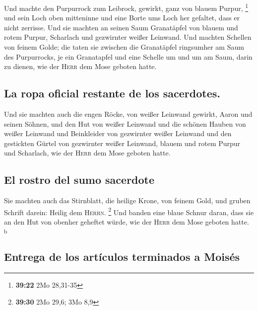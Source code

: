  Und machte den Purpurrock zum Leibrock, gewirkt, ganz
von blauem Purpur, \footnote{\textbf{39:22} 2Mo 28,31-35}
 und sein Loch oben mitteninne und eine Borte ums Loch
her gefaltet, dass er nicht zerrisse.  Und sie machten an
seinen Saum Granatäpfel von blauem und rotem Purpur, Scharlach und
gezwirnter weißer Leinwand.  Und machten Schellen von
feinem Golde; die taten sie zwischen die Granatäpfel ringsumher am Saum
des Purpurrocks,  je ein Granatapfel und eine Schelle um
und um am Saum, darin zu dienen, wie der \textsc{Herr} dem Mose geboten
hatte.

\hypertarget{la-ropa-oficial-restante-de-los-sacerdotes.}{%
\subsection{La ropa oficial restante de los
sacerdotes.}\label{la-ropa-oficial-restante-de-los-sacerdotes.}}

 Und sie machten auch die engen Röcke, von weißer
Leinwand gewirkt, Aaron und seinen Söhnen,  und den Hut
von weißer Leinwand und die schönen Hauben von weißer Leinwand und
Beinkleider von gezwirnter weißer Leinwand  und den
gestickten Gürtel von gezwirnter weißer Leinwand, blauem und rotem
Purpur und Scharlach, wie der \textsc{Herr} dem Mose geboten hatte.

\hypertarget{el-rostro-del-sumo-sacerdote}{%
\subsection{El rostro del sumo
sacerdote}\label{el-rostro-del-sumo-sacerdote}}

 Sie machten auch das Stirnblatt, die heilige Krone, von
feinem Gold, und gruben Schrift darein: Heilig dem \textsc{Herrn}.
\footnote{\textbf{39:30} 2Mo 29,6; 3Mo 8,9}  Und banden
eine blaue Schnur daran, dass sie an den Hut von obenher geheftet würde,
wie der \textsc{Herr} dem Mose geboten hatte. \textsuperscript{b}

\hypertarget{entrega-de-los-artuxedculos-terminados-a-moisuxe9s}{%
\subsection{Entrega de los artículos terminados a
Moisés}\label{entrega-de-los-artuxedculos-terminados-a-moisuxe9s}}

